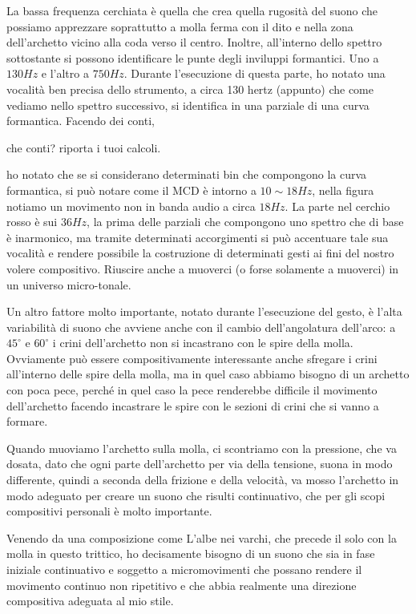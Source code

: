 La bassa frequenza cerchiata è quella che crea quella rugosità del suono che
possiamo apprezzare soprattutto a molla ferma con il dito e nella zona dell’archetto
vicino alla coda verso il centro. Inoltre, all’interno dello spettro sottostante
si possono identificare le punte degli inviluppi formantici. Uno a $130Hz$ e l’altro
a $750Hz$. Durante l’esecuzione di questa parte, ho notato una vocalità ben precisa
dello strumento, a circa 130 hertz (appunto) che come vediamo nello spettro
successivo, si identifica in una parziale di una curva formantica. Facendo dei
conti,

\Large{\color{red} che conti? riporta i tuoi calcoli.}

ho notato che se si considerano determinati bin che compongono la curva
formantica, si può notare come il MCD è intorno a $10\sim18Hz$, nella figura notiamo
un movimento non in banda audio a circa $18Hz$. La parte nel cerchio rosso è sui
$36Hz$, la prima delle parziali che compongono uno spettro che di base è inarmonico,
ma tramite determinati accorgimenti si può accentuare tale sua vocalità e rendere
possibile la costruzione di determinati gesti ai fini del nostro volere compositivo.
Riuscire anche a muoverci (o forse solamente a muoverci) in un universo micro-tonale.

Un altro fattore molto importante, notato durante l’esecuzione del gesto, è l’alta
variabilità di suono che avviene anche con il cambio dell’angolatura dell’arco:
a $45^\circ$ e $60^\circ$ i crini dell’archetto non si incastrano con le spire della molla.
Ovviamente può essere compositivamente interessante anche sfregare i crini
all’interno delle spire della molla, ma in quel caso abbiamo bisogno di un
archetto con poca pece, perché in quel caso la pece renderebbe difficile il
movimento dell’archetto facendo incastrare le spire con le sezioni di crini che
si vanno a formare.

Quando muoviamo l’archetto sulla molla, ci scontriamo con la pressione, che va
dosata, dato che ogni parte dell’archetto per via della tensione, suona in modo
differente, quindi a seconda della frizione e della velocità, va mosso l’archetto
in modo adeguato per creare un suono che risulti continuativo, che per gli scopi
compositivi personali è molto importante.

Venendo da una composizione come L’albe nei varchi, che precede il solo con la
molla in questo trittico, ho decisamente bisogno di un suono che sia in fase
iniziale continuativo e soggetto a micromovimenti che possano rendere il movimento
continuo non ripetitivo e che abbia realmente una direzione compositiva adeguata
al mio stile.

